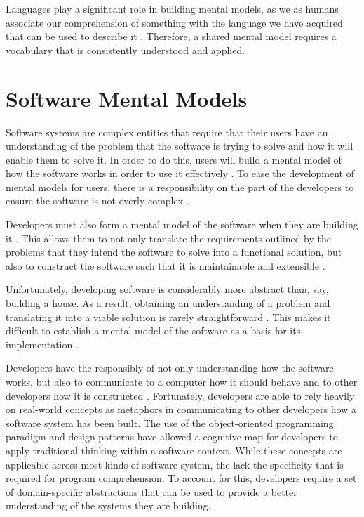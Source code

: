 Languages play a significant role in building mental models, as we as humans associate our comprehension of something with the language we have acquired that can be used to describe it \cite{Fauconnier94a}. Therefore, a shared mental model requires a vocabulary that is consistently understood and applied.


\section{Software Mental Models} %
\label{sec:software_mental_models}

Software systems are complex entities that require that their users have an understanding of the problem that the software is trying to solve and how it will enable them to solve it. In order to do this, users will build a mental model of how the software works in order to use it effectively \cite{Carroll87a}. To ease the development of mental models for users, there is a responsibility on the part of the developers to ensure the software is not overly complex \cite{Krug05a}.

Developers must also form a mental model of the software when they are building it \cite{Storey99a}. This allows them to not only translate the requirements outlined by the problems that they intend the software to solve into a functional solution, but also to construct the software such that it is maintainable and extensible \cite{Littman87a}.

Unfortunately, developing software is considerably more abstract than, say, building a house. As a result, obtaining an understanding of a problem and translating it into a viable solution is rarely straightforward \cite{Leffingwell99a}. This makes it difficult to establish a mental model of the software as a basis for its implementation \cite{Storey99a}.

Developers have the responsibly of not only understanding how the software works, but also to communicate to a computer how it should behave and to other developers how it is constructed \cite{Abelson96a}. Fortunately, developers are able to rely heavily on real-world concepts as metaphors in communicating to other developers how a software system has been built. The use of the object-oriented programming paradigm \cite{Wirfs90a} and design patterns \cite{Gamma95a} have allowed a cognitive map for developers to apply traditional thinking within a software context. While these concepts are applicable across most kinds of software system, the lack the specificity that is required for program comprehension. To account for this, developers require a set of domain-specific abstractions that can be used to provide a better understanding of the systems they are building.

